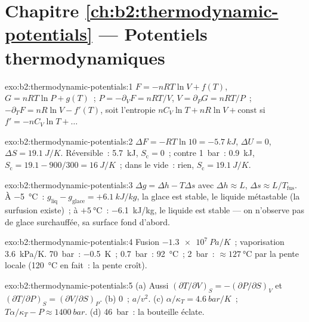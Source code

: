 \section*{Chapitre \ref{ch:b2:thermodynamic-potentials} --- Potentiels thermodynamiques}

\begin{solution}{exo:b2:thermodynamic-potentials:1}
$F = -nRT\ln V + f(T)$, $G = nRT\ln P + g(T)$~; $P = -\partial_VF = nRT/V$,
$V = \partial_PG = nRT/P$~; $-\partial_TF = nR\ln V - f'(T)$, soit l'entropie
$nC_V\ln T + nR\ln V + \text{const}$ si $f' = -nC_V\ln T + \dots$
\end{solution}

\begin{solution}{exo:b2:thermodynamic-potentials:2}
$\Delta F = -RT\ln 10 = \qty{-5.7}{kJ}$, $\Delta U = 0$, $\Delta S = \qty{19.1}{J/K}$.
Réversible~: \qty{5.7}{kJ}, $S_{\text{c}} = 0$~; contre \qty{1}{bar}~: \qty{0.9}{kJ},
$S_{\text{c}} = 19.1 - 900/300 = \qty{16}{J/K}$~; dans le vide~: rien, $S_{\text{c}} =
\qty{19.1}{J/K}$.
\end{solution}

\begin{solution}{exo:b2:thermodynamic-potentials:3}
$\Delta g = \Delta h - T\Delta s$ avec $\Delta h \approx L$, $\Delta s \approx L/T_{\text{fus}}$.
À \qty{-5}{\celsius}~: $g_{\text{liq}} - g_{\text{glace}} = +\qty{6.1}{kJ/kg}$, la glace est
stable, le liquide métastable (la surfusion existe)~; à $+\qty{5}{\celsius}$~:
\qty{-6.1}{kJ/kg}, le liquide est stable --- on n'observe pas de glace surchauffée, sa
surface fond d'abord.
\end{solution}

\begin{solution}{exo:b2:thermodynamic-potentials:4}
Fusion $\qty{-1.3e7}{Pa/K}$~; vaporisation \qty{3.6}{kPa/K}. \qty{70}{bar}~:
\qty{-0.5}{K}~; \qty{0.7}{bar}~: \qty{92}{\celsius}~; \qty{2}{bar}~: $\approx
\qty{127}{\celsius}$ par la pente locale (\qty{120}{\celsius} en fait~: la
pente croît).
\end{solution}

\begin{solution}{exo:b2:thermodynamic-potentials:5}
(a) Aussi $(\partial T/\partial V)_S = -(\partial P/\partial S)_V$ et
$(\partial T/\partial P)_S = (\partial V/\partial S)_P$. (b) $0$~; $a/v^2$. (c)
$\alpha/\kappa_T = \qty{4.6}{bar/K}$~; $T\alpha/\kappa_T - P \approx \qty{1400}{bar}$.
(d) \qty{46}{bar}~: la bouteille éclate.
\end{solution}

